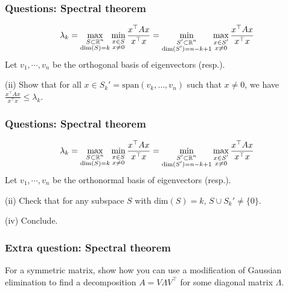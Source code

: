 \documentclass{beamer}
\begin{document}
\begin{frame}[t]
\frametitle{Questions: Spectral theorem}
\vspace{-15pt}
\begin{align*}
\lambda_k = \max_{\substack{S \subset \mathbb{R}^n \\ \text{dim}(S) = k}} \min_{\substack{x \in S \\ x \neq 0}} \frac{x^\top A x}{x^\top x} = \min_{\substack{S' \subset \mathbb{R}^n \\ \text{dim}(S') = n-k+1}} \max_{\substack{x \in S' \\ x \neq 0}} \frac{x^\top A x}{x^\top x}
\end{align*}
Let $v_1, \cdots, v_n$ be the orthogonal basis of eigenvectors (resp.).

(ii) Show that for all $x \in S_k' = \text{span}(v_k, \dots, v_n)$ such that $x \neq 0$, we have  $\frac{x^\top A x}{x^\top x} \leq \lambda_k$.
\end{frame}

\begin{frame}[t]
\frametitle{Questions: Spectral theorem}
\vspace{-15pt}
\begin{align*}
\lambda_k = \max_{\substack{S \subset \mathbb{R}^n \\ \text{dim}(S) = k}} \min_{\substack{x \in S \\ x \neq 0}} \frac{x^\top A x}{x^\top x} = \min_{\substack{S' \subset \mathbb{R}^n \\ \text{dim}(S') = n-k+1}} \max_{\substack{x \in S' \\ x \neq 0}} \frac{x^\top A x}{x^\top x}
\end{align*}
Let $v_1, \cdots, v_n$ be the orthonormal basis of eigenvectors (resp.).

(ii) Check that for any subspace $S$ with $\text{dim}(S) = k$, $S \cup S_k' \neq \{0\}$.

(iv) Conclude.
\end{frame}

\begin{frame}[t]
\frametitle{Extra question: Spectral theorem}
For a symmetric matrix, show how you can use a modification of Gaussian elimination to find a decomposition $A = V \Lambda V^\top$ for some diagonal matrix $\Lambda$.
\end{frame}

\begin{frame}[t]

\end{frame}

\begin{frame}[t]

\end{frame}
\end{document}
